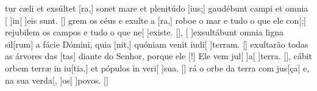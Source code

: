 {    %
    {tur cæli et exsúltet [ra,] sonet mare et plenitúdo [ius;] gaudébunt campi et omnia [ ]{in}[ ]{e}is sunt. [\LinkLA]}%
        {grem os céus e exulte a [ra,] roboe o mar e tudo o que ele con[;] rejubilem os campos e tudo o que ne[ ]{e}{xis}te. [\LinkPT]},
    {[ ]{ex}sultábunt omnia ligna sil[rum] a fácie Dómini, quia [nit,] quóniam venit iudi[ ]{ter}ram. [\LinkLA]}%
        { exultarão todas as árvores das [tas] diante do Senhor, porque ele [!] Ele vem jul[ ]{a}[ ]{ter}ra. [\LinkPT]},
    {cábit orbem terræ in iu[tia,] et pópulos in veri[ ]{su}a. [\LinkLA]}%
        {rá o orbe da terra com jus[ça] e, na sua verda[, ]{os}[ ]{po}vos. [\LinkPT]}

}